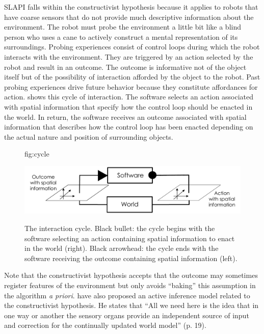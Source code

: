 \documentclass[pmlr]{jmlr}%
\begin{document}
SLAPI falls within the constructivist hypothesis because it applies to robots that have coarse sensors that do not provide much descriptive information about the environment. 
The robot must probe the environment a little bit like a blind person who uses a cane to actively construct a mental representation of its surroundings. 
Probing experiences consist of control loops during which the robot interacts with the environment.   
They are triggered by an action selected by the robot and result in an outcome. 
The outcome is informative not of the object itself but of the possibility of interaction afforded by the object to the robot. 
Past probing experiences drive future behavior because they constitute affordances for action. 
 shows this cycle of interaction. 
The software selects an action associated with spatial information that specify how the control loop should be enacted in the world. 
In return, the software receives an outcome associated with spatial information that describes how the control loop has been enacted depending on the actual nature and position of surrounding objects. 


\begin{figure}[htbp]
	\floatconts
	{fig:cycle}
	{\caption{The interaction cycle. Black bullet: the cycle begins with the software selecting an action containing spatial information to enact in the world (right). Black arrowhead: the cycle ends with the software receiving the outcome containing spatial information (left).}}
	{\includegraphics[width=0.8\linewidth]{images/Figure_0_Cycle}}
\end{figure}

Note that the constructivist hypothesis accepts that the outcome may sometimes register features of the environment but only avoids ``baking'' this assumption in the algorithm \textit{a priori}. 
\cite{rudrauf_mathematical_2017} have also proposed an active inference model related to the constructivist hypothesis. He states that ``All we need here is the idea that in one way or another the sensory organs provide an independent source of input and correction for the continually updated world model'' (p. 19).
\end{document}
